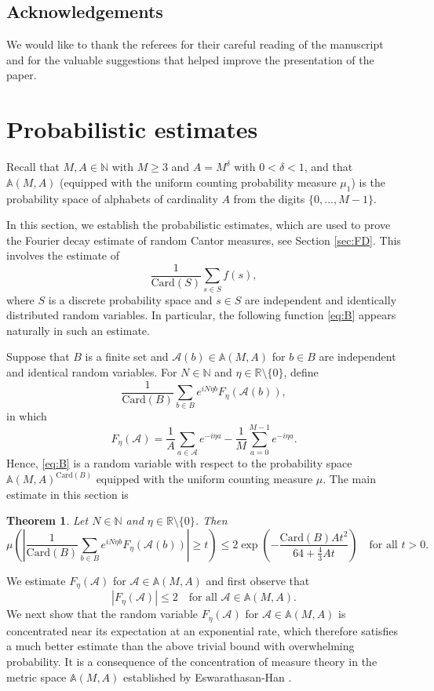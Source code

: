 \documentclass[12pt,reqno]{amsart}
\newcommand\Ab{\mathbb{A}}
\newcommand\Ac{\mathcal{A}}
\newcommand\Card{\mathrm{Card}}
\newcommand\N{\mathbb{N}}
\newcommand\R{\mathbb{R}}
\theoremstyle{plain}
\newtheorem{thm}{\textbf{Theorem}}[section]
\theoremstyle{remark}
\numberwithin{equation}{section}
\begin{document}
\subsection*{Acknowledgements}
We would like to thank the referees for their careful reading of the manuscript and for the valuable suggestions that helped improve the presentation of the paper.


\section{Probabilistic estimates}\label{sec:prob}
Recall that $M,A\in\N$ with $M\ge3$ and $A=M^\delta$ with $0<\delta<1$, and that $\Ab(M,A)$ (equipped with the uniform counting probability measure $\mu_1$) is the probability space of alphabets of cardinality $A$ from the digits $\{0,...,M-1\}$. 

In this section, we establish the probabilistic estimates, which are used to prove the Fourier decay estimate of random Cantor measures, see Section \ref{sec:FD}. This involves the estimate of
$$\frac{1}{\Card(S)}\sum_{s\in S}f(s),$$
where $S$ is a discrete probability space and $s\in S$ are independent and identically distributed random variables. In particular, the following function \eqref{eq:B} appears naturally in such an estimate.

Suppose that $B$ is a finite set and $\Ac(b)\in\Ab(M,A)$ for $b\in B$ are independent and identical random variables. For $N\in\N$ and $\eta\in\R\setminus\{0\}$, define
\begin{equation}\label{eq:B}
\frac{1}{\Card(B)}\sum_{b\in B}e^{iN\eta b}F_\eta\left(\Ac(b)\right),
\end{equation}
in which
\begin{equation}\label{eq:F}
F_\eta(\Ac)=\frac1A\sum_{a\in\Ac}e^{-i\eta a}-\frac1M\sum_{a=0}^{M-1}e^{-i\eta a}.
\end{equation}
Hence, \eqref{eq:B} is a random variable with respect to the probability space $\Ab(M,A)^{\Card(B)}$ equipped with the uniform counting measure $\mu$. The main estimate in this section is
\begin{thm}\label{thm:P}
Let $N\in\N$ and $\eta\in\R\setminus\{0\}$. Then
$$\mu\left(\left|\frac{1}{\Card(B)}\sum_{b\in B}e^{iN\eta b}F_\eta\left(\Ac(b)\right)\right|\ge t\right)\le2\exp\left(-\frac{\Card(B)At^2}{64+\frac43At}\right)\quad\text{for all }t>0.$$
\end{thm} 

We estimate $F_\eta(\Ac)$ for $\Ac\in\Ab(M,A)$ and first observe that 
\begin{equation}\label{eq:Fmax}
\left|F_\eta(\Ac)\right|\le2\quad\text{for all }\Ac\in\Ab(M,A).
\end{equation}
We next show that the random variable $F_\eta(\Ac)$ for $\Ac\in\Ab(M,A)$ is concentrated near its expectation at an exponential rate, which therefore satisfies a much better estimate than the above trivial bound with overwhelming probability. It is a consequence of the concentration of measure theory in the metric space $\Ab(M,A)$ established by Eswarathasan-Han \cite[Section 2]{EH}. 
\end{document}
